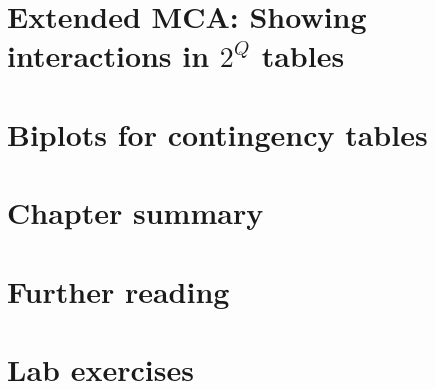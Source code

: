 \documentclass[11pt]{book}\usepackage[]{graphicx}\usepackage[]{color}
\begin{document}


\section{Extended MCA: Showing interactions in $2^Q$ tables}\label{sec:ca-mcainter}
\section{Biplots for contingency tables}\label{sec:biplot}
\section{Chapter summary}\label{sec:ca-summary}
\section{Further reading}\label{sec:ca-reading}
\section{Lab exercises}\label{sec:ca-lab}



%
%
%
%
%
%

%
%
%
\backmatter
{}
{\itemsep -1pt

}
\end{document}
